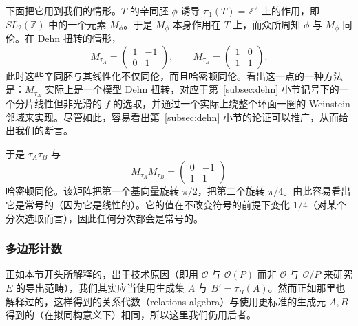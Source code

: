 
下面把它用到我们的情形。$T$ 的辛同胚 $\phi$ 诱导 $\pi_1(T)=\mathbb{Z}^2$ 上的作用，即 $SL_2(\mathbb{Z})$ 中的一个元素 $M_\phi$。于是 $M_\phi$ 本身作用在 $T$ 上，而众所周知 $\phi$ 与 $M_\phi$ 同伦。在 Dehn 扭转的情形，
\[
M_{\tau_A}=\begin{pmatrix}1&-1\\0&1\end{pmatrix},
\qquad
M_{\tau_B}=\begin{pmatrix}1&0\\1&1\end{pmatrix}.
\]
此时这些辛同胚与其线性化不仅同伦，而且哈密顿同伦。看出这一点的一种方法是：$M_{\tau_A}$ 实际上是一个模型 Dehn 扭转，对应于第~\ref{subsec:dehn} 小节记号下的一个分片线性但非光滑的 $f$ 的选取，并通过一个实际上绕整个环面一圈的 Weinstein 邻域来实现。尽管如此，容易看出第~\ref{subsec:dehn} 小节的论证可以推广，从而给出我们的断言。

于是 $\tau_A\tau_B$ 与
\[
M_{\tau_A}M_{\tau_B}=\begin{pmatrix}0&-1\\1&1\end{pmatrix}
\]
哈密顿同伦。该矩阵把第一个基向量旋转 $\pi/2$，把第二个旋转 $\pi/4$。由此容易看出它是常号的（因为它是线性的）。它的值在不改变符号的前提下变化 $1/4$（对某个分次选取而言），因此任何分次都会是常号的。

\subsubsection{多边形计数}\label{subsec:counting}

正如本节开头所解释的，出于技术原因（即用 $\mathcal{O}$ 与 $\mathcal{O}(P)$ 而非 $\mathcal{O}$ 与 $\mathcal{O}/P$ 来研究 $E$ 的导出范畴），我们其实应当使用生成集 $A$ 与 $B'=\tau_B(A)$。然而正如那里也解释过的，这样得到的关系代数（relations algebra）与使用更标准的生成元 $A,B$ 得到的（在拟同构意义下）相同，所以这里我们仍用后者。

